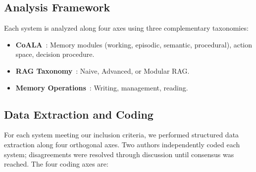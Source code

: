 \subsection{Analysis Framework}

Each system is analyzed along four axes using three complementary
taxonomies:

\begin{itemize}[leftmargin=*, nosep]
    \item \textbf{CoALA}~\cite{sumers2024coala}: Memory modules
    (working, episodic, semantic, procedural), action space, decision
    procedure.
    \item \textbf{RAG Taxonomy}~\cite{gao2023rag}: Naive, Advanced,
    or Modular RAG.
    \item \textbf{Memory Operations}~\cite{zhang2024survey}: Writing,
    management, reading.
\end{itemize}


\subsection{Data Extraction and Coding}
\label{sec:coding}

For each system meeting our inclusion criteria, we performed structured
data extraction along four orthogonal axes. Two authors independently
coded each system; disagreements were resolved through discussion until
consensus was reached. The four coding axes are:

